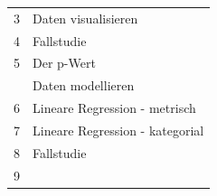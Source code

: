 \documentclass[12pt,ngerman,]{book}
\begin{document}
\begin{longtable}[]{@{}cl@{}}
\begin{minipage}[t]{0.12\columnwidth}\centering\strut
3\strut
\end{minipage} & \begin{minipage}[t]{0.50\columnwidth}\raggedright\strut
Daten visualisieren\strut
\end{minipage}\tabularnewline
\begin{minipage}[t]{0.12\columnwidth}\centering\strut
4\strut
\end{minipage} & \begin{minipage}[t]{0.50\columnwidth}\raggedright\strut
Fallstudie\strut
\end{minipage}\tabularnewline
\begin{minipage}[t]{0.12\columnwidth}\centering\strut
5\strut
\end{minipage} & \begin{minipage}[t]{0.50\columnwidth}\raggedright\strut
Der p-Wert\strut
\end{minipage}\tabularnewline
\begin{minipage}[t]{0.48\columnwidth}\centering\strut
\strut
\end{minipage} & \begin{minipage}[t]{0.48\columnwidth}\raggedright\strut
Daten modellieren\strut
\end{minipage}\tabularnewline
\begin{minipage}[t]{0.12\columnwidth}\centering\strut
6\strut
\end{minipage} & \begin{minipage}[t]{0.50\columnwidth}\raggedright\strut
Lineare Regression - metrisch\strut
\end{minipage}\tabularnewline
\begin{minipage}[t]{0.12\columnwidth}\centering\strut
7\strut
\end{minipage} & \begin{minipage}[t]{0.50\columnwidth}\raggedright\strut
Lineare Regression - kategorial\strut
\end{minipage}\tabularnewline
\begin{minipage}[t]{0.12\columnwidth}\centering\strut
8\strut
\end{minipage} & \begin{minipage}[t]{0.50\columnwidth}\raggedright\strut
Fallstudie\strut
\end{minipage}\tabularnewline
\begin{minipage}[t]{0.12\columnwidth}\centering\strut
9\strut
\end{minipage} & \begin{minipage}[t]{0.50\columnwidth}\raggedright\strut

\end{minipage}
\end{longtable}
\end{document}
